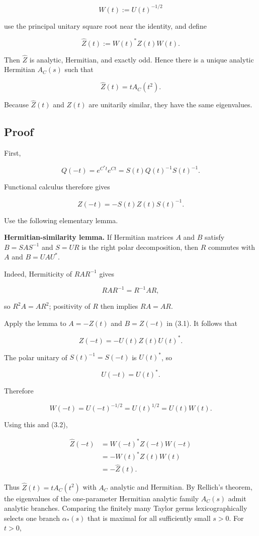 \documentclass[11pt,a4paper]{article}
\begin{document}
\[
W(t):=U(t)^{-1/2}
\]

use the principal unitary square root near the identity, and define

\[
\widehat Z(t):=W(t)^*Z(t)W(t).
\]

Then \(\widehat Z\) is analytic, Hermitian, and exactly odd. Hence there is a unique analytic Hermitian \(A_C(s)\) such that

\[
\widehat Z(t)=tA_C(t^2).
\]

Because \(\widehat Z(t)\) and \(Z(t)\) are unitarily similar, they have the same eigenvalues.

\subsection{Proof}\label{proof}

First,

\[
Q(-t)=e^{C^*t}e^{Ct}
      =S(t)Q(t)^{-1}S(t)^{-1}.
\]

Functional calculus therefore gives

\[
Z(-t)=-S(t)Z(t)S(t)^{-1}. \tag{3.1}
\]

Use the following elementary lemma.

\textbf{Hermitian-similarity lemma.} If Hermitian matrices \(A\) and \(B\) satisfy \(B=SAS^{-1}\) and \(S=UR\) is the right polar decomposition, then \(R\) commutes with \(A\) and \(B=UAU^*\).

Indeed, Hermiticity of \(RAR^{-1}\) gives

\[
RAR^{-1}=R^{-1}AR,
\]

so \(R^2A=AR^2\); positivity of \(R\) then implies \(RA=AR\).

Apply the lemma to \(A=-Z(t)\) and \(B=Z(-t)\) in (3.1). It follows that

\[
Z(-t)=-U(t)Z(t)U(t)^*. \tag{3.2}
\]

The polar unitary of \(S(t)^{-1}=S(-t)\) is \(U(t)^*\), so

\[
U(-t)=U(t)^*.
\]

Therefore

\[
W(-t)=U(-t)^{-1/2}=U(t)^{1/2}=U(t)W(t).
\]

Using this and (3.2),

\[
\begin{aligned}
\widehat Z(-t)
 &=W(-t)^*Z(-t)W(-t)\\
 &=-W(t)^*Z(t)W(t)\\
 &=-\widehat Z(t).
\end{aligned}
\]

Thus \(\widehat Z(t)=tA_C(t^2)\) with \(A_C\) analytic and Hermitian. By Rellich's theorem, the eigenvalues of the one-parameter Hermitian analytic family \(A_C(s)\) admit analytic branches. Comparing the finitely many Taylor germs lexicographically selects one branch \(\alpha_*(s)\) that is maximal for all sufficiently small \(s>0\). For \(t>0\),
\end{document}
